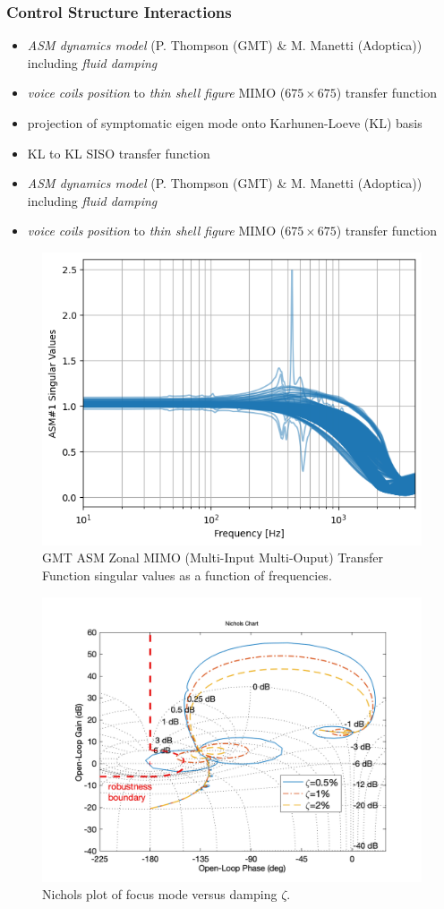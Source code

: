 \documentclass[]{AO4ELT}  %
\begin{document}
\subsubsection{Control Structure Interactions}
\label{sec:fem-csi}

\begin{itemize}
   \item \emph{ASM dynamics model} (P. Thompson (GMT) \& M. Manetti (Adoptica)) including \emph{fluid damping}
   \item \emph{voice coils position} to \emph{thin shell figure} MIMO ($675\times 675$) transfer function
\end{itemize}
\begin{itemize}
   \item projection of symptomatic eigen mode onto Karhunen-Loeve (KL) basis
   \item KL to KL SISO transfer function
\end{itemize}

\begin{itemize}
   \item \emph{ASM dynamics model} (P. Thompson (GMT) \& M. Manetti (Adoptica)) including \emph{fluid damping}
   \item \emph{voice coils position} to \emph{thin shell figure} MIMO ($675\times 675$) transfer function
\end{itemize}

\begin{figure}
   \centering
   \includegraphics[width=0.6\linewidth]{./figures/asm-mimo-svd.png}
   \caption{GMT ASM Zonal MIMO (Multi-Input Multi-Ouput) Transfer Function singular values as a function of frequencies.}
   \label{fig:10}
\end{figure}

\begin{figure}
   \centering
   \includegraphics[trim=3cm 0 0 3cm,clip,width=0.6\linewidth]{./figures/defocusNicholsLTF.png}
   \caption{Nichols plot of focus mode versus damping $\zeta$.}
   \label{fig:11}
\end{figure}
\end{document}
